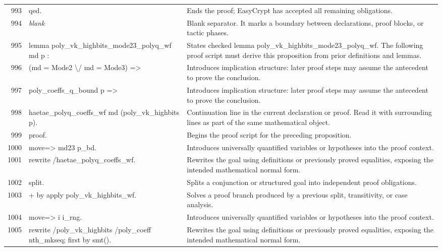 \documentclass[10pt]{article}
\begin{document}
\begin{longtable}{r L{0.53\textwidth} L{0.37\textwidth}}
993 & {\ttfamily\scriptsize qed.} & Ends the proof; EasyCrypt has accepted all remaining obligations. \\
994 & {\ttfamily\scriptsize \emph{blank}} & Blank separator.  It marks a boundary between declarations, proof blocks, or tactic phases. \\
995 & {\ttfamily\scriptsize lemma poly\_vk\_highbits\_mode23\_polyq\_wf md p :} & States checked lemma poly\_vk\_highbits\_mode23\_polyq\_wf.  The following proof script must derive this proposition from prior definitions and lemmas. \\
996 & {\ttfamily\scriptsize   (md = Mode2 \textbackslash{}/ md = Mode3) =>} & Introduces implication structure: later proof steps may assume the antecedent to prove the conclusion. \\
997 & {\ttfamily\scriptsize   poly\_coeffs\_q\_bound p =>} & Introduces implication structure: later proof steps may assume the antecedent to prove the conclusion. \\
998 & {\ttfamily\scriptsize   haetae\_polyq\_coeffs\_wf md (poly\_vk\_highbits p).} & Continuation line in the current declaration or proof.  Read it with surrounding lines as part of the same mathematical object. \\
999 & {\ttfamily\scriptsize proof.} & Begins the proof script for the preceding proposition. \\
1000 & {\ttfamily\scriptsize move=> md23 p\_bd.} & Introduces universally quantified variables or hypotheses into the proof context. \\
1001 & {\ttfamily\scriptsize rewrite /haetae\_polyq\_coeffs\_wf.} & Rewrites the goal using definitions or previously proved equalities, exposing the intended mathematical normal form. \\
1002 & {\ttfamily\scriptsize split.} & Splits a conjunction or structured goal into independent proof obligations. \\
1003 & {\ttfamily\scriptsize + by apply poly\_vk\_highbits\_wf.} & Solves a proof branch produced by a previous split, transitivity, or case analysis. \\
1004 & {\ttfamily\scriptsize move=> i i\_rng.} & Introduces universally quantified variables or hypotheses into the proof context. \\
1005 & {\ttfamily\scriptsize rewrite /poly\_vk\_highbits /poly\_coeff nth\_mkseq; first by smt().} & Rewrites the goal using definitions or previously proved equalities, exposing the intended mathematical normal form. \\

\end{longtable}
\end{document}
